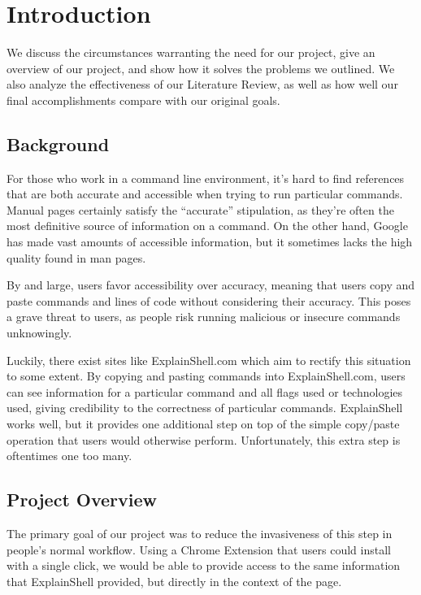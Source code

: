 \documentclass[11pt]{article}
\begin{document}
\tableofcontents

\newpage

\section{Introduction}

We discuss the circumstances warranting the need for our project, give an
overview of our project, and show how it solves the problems we outlined. We
also analyze the effectiveness of our Literature Review, as well as how well our
final accomplishments compare with our original goals.

\subsection{Background}

For those who work in a command line environment, it's hard to find references
that are both accurate and accessible when trying to run particular commands.
Manual pages certainly satisfy the ``accurate'' stipulation, as they're often
the most definitive source of information on a command. On the other hand,
Google has made vast amounts of accessible information, but it sometimes lacks
the high quality found in man pages.

By and large, users favor accessibility over accuracy, meaning that users copy
and paste commands and lines of code without considering their accuracy. This
poses a grave threat to users, as people risk running malicious or insecure
commands unknowingly.

Luckily, there exist sites like ExplainShell.com which aim to rectify this
situation to some extent. By copying and pasting commands into ExplainShell.com,
users can see information for a particular command and all flags used or
technologies used, giving credibility to the correctness of particular commands.
ExplainShell works well, but it provides one additional step on top of the
simple copy/paste operation that users would otherwise perform. Unfortunately,
this extra step is oftentimes one too many.

\subsection{Project Overview}

The primary goal of our project was to reduce the invasiveness of this step in
people's normal workflow. Using a Chrome Extension that users could install
with a single click, we would be able to provide access to the same information
that ExplainShell provided, but directly in the context of the page.
\end{document}
